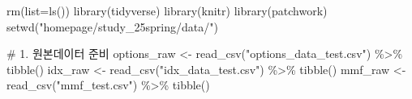 \documentclass[
  a4paper,
  DIV=11,
  numbers=noendperiod]{scrreprt}
\newenvironment{Shaded}{\begin{snugshade}}{\end{snugshade}}
\newcommand{\AttributeTok}[1]{\textcolor[rgb]{0.40,0.45,0.13}{#1}}
\newcommand{\CommentTok}[1]{\textcolor[rgb]{0.37,0.37,0.37}{#1}}
\newcommand{\FunctionTok}[1]{\textcolor[rgb]{0.28,0.35,0.67}{#1}}
\newcommand{\NormalTok}[1]{\textcolor[rgb]{0.00,0.23,0.31}{#1}}
\newcommand{\OtherTok}[1]{\textcolor[rgb]{0.00,0.23,0.31}{#1}}
\newcommand{\SpecialCharTok}[1]{\textcolor[rgb]{0.37,0.37,0.37}{#1}}
\newcommand{\StringTok}[1]{\textcolor[rgb]{0.13,0.47,0.30}{#1}}
\begin{document}
\begin{Shaded}
\begin{Highlighting}[]
\FunctionTok{rm}\NormalTok{(}\AttributeTok{list=}\FunctionTok{ls}\NormalTok{())}
\FunctionTok{library}\NormalTok{(tidyverse)}
\FunctionTok{library}\NormalTok{(knitr)}
\FunctionTok{library}\NormalTok{(patchwork)}
\FunctionTok{setwd}\NormalTok{(}\StringTok{"homepage/study\_25spring/data/"}\NormalTok{)}

\CommentTok{\# 1. 원본데이터 준비}
\NormalTok{options\_raw }\OtherTok{\textless{}{-}} \FunctionTok{read\_csv}\NormalTok{(}\StringTok{"options\_data\_test.csv"}\NormalTok{) }\SpecialCharTok{\%\textgreater{}\%} \FunctionTok{tibble}\NormalTok{()}
\NormalTok{idx\_raw }\OtherTok{\textless{}{-}} \FunctionTok{read\_csv}\NormalTok{(}\StringTok{"idx\_data\_test.csv"}\NormalTok{) }\SpecialCharTok{\%\textgreater{}\%} \FunctionTok{tibble}\NormalTok{()}
\NormalTok{mmf\_raw }\OtherTok{\textless{}{-}} \FunctionTok{read\_csv}\NormalTok{(}\StringTok{"mmf\_test.csv"}\NormalTok{) }\SpecialCharTok{\%\textgreater{}\%} \FunctionTok{tibble}\NormalTok{()}


\end{Highlighting}
\end{Shaded}
\end{document}
